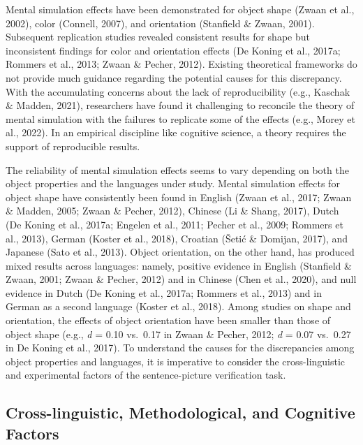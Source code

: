 \documentclass[
  man,mask,floatsintext]{apa7}
\begin{document}
Mental simulation effects have been demonstrated for object shape
(Zwaan et al., 2002), color
(Connell, 2007), and orientation
(Stanfield \& Zwaan, 2001). Subsequent replication studies revealed
consistent results for shape but inconsistent findings for color and
orientation effects (De Koning et al., 2017a; Rommers et al., 2013; Zwaan \& Pecher, 2012). Existing theoretical frameworks
do not provide much guidance regarding the potential causes for this
discrepancy. With the accumulating concerns about the lack of
reproducibility (e.g., Kaschak \& Madden, 2021), researchers
have found it challenging to reconcile the theory of mental simulation
with the failures to replicate some of the effects (e.g., Morey et al., 2022).
In an empirical discipline like cognitive science, a theory requires the
support of reproducible results.

The reliability of mental simulation effects seems to vary depending on
both the object properties and the languages under study. Mental
simulation effects for object shape have consistently been found in
English (Zwaan et al., 2017; Zwaan \& Madden, 2005; Zwaan \& Pecher, 2012), Chinese (Li \& Shang, 2017),
Dutch (De Koning et al., 2017a; Engelen et al., 2011; Pecher et al., 2009; Rommers et al., 2013), German
(Koster et al., 2018), Croatian
(Šetić \& Domijan, 2017), and Japanese
(Sato et al., 2013). Object orientation, on the other hand, has
produced mixed results across languages: namely, positive evidence in
English (Stanfield \& Zwaan, 2001; Zwaan \& Pecher, 2012)
and in Chinese (Chen et al., 2020), and null evidence in Dutch
(De Koning et al., 2017a; Rommers et al., 2013) and in German
as a second language (Koster et al., 2018). Among studies
on shape and orientation, the effects of object orientation have been
smaller than those of object shape (e.g., \emph{d} = 0.10 vs.~0.17 in Zwaan \&
Pecher, 2012; \emph{d} = 0.07 vs.~0.27 in De Koning et al., 2017). To
understand the causes for the discrepancies among object properties and
languages, it is imperative to consider the cross-linguistic and
experimental factors of the sentence-picture verification task.

\hypertarget{cross-linguistic-methodological-and-cognitive-factors}{%
\subsection{Cross-linguistic, Methodological, and Cognitive Factors}\label{cross-linguistic-methodological-and-cognitive-factors}}
\end{document}
